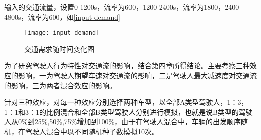输入的交通流量，设置0-1200s，流率为600，1200-2400s，流率为1800，2400-4800s，流率为600，如\autoref{input-demand}

\begin{figure}[!htb]
\begin{center}
\texttt{[image: input-demand]}
\end{center}
\caption{交通需求随时间变化图}
\label{input-demand}
\end{figure}

为了研究驾驶人行为特性对交通流的影响，结合第四章所得结论。主要考察三种效应的影响，一为驾驶人期望车速对交通流的影响，二是驾驶人最大减速度对交通流的影响，三为两者混合效应的影响。

针对三种效应，对每一种效应分别选择两种车型，以全部A类型驾驶人，1：3，1：1和3：1的比例混合和全部B类型驾驶人分别进行模拟，也就是说B类型的驾驶人从0\%到25\%,50\%,75\%增加到100\%，由于在驾驶人混合中，车辆的出发顺序随机，在驾驶人混合中以不同随机种子数模拟10次。


